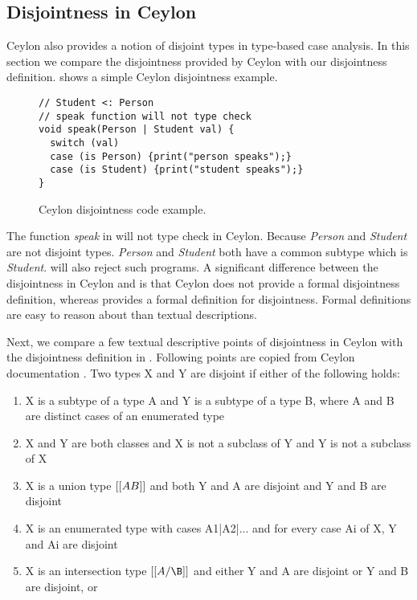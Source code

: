 \subsection{Disjointness in Ceylon}
\label{sec:inter:ceylon}


Ceylon also provides a notion of disjoint types in type-based case analysis. In this section
we compare the disjointness provided by Ceylon with our disjointness definition.
 shows a simple Ceylon disjointness example.


\begin{figure}[t]
\begin{lstlisting}[xleftmargin=.2\textwidth, xrightmargin=.2\textwidth]
// Student <: Person
// speak function will not type check
void speak(Person | Student val) {
  switch (val)
  case (is Person) {print("person speaks");}
  case (is Student) {print("student speaks");} 
}
\end{lstlisting}
\caption{Ceylon disjointness code example.}
\label{inter:list:ceylon}
\end{figure}

\noindent The function \emph{speak} in  
will not type check in Ceylon. Because \emph{Person} and
\emph{Student} are not disjoint types. \emph{Person} and \emph{Student} both have a common
subtype which is \emph{Student}. \cal will also reject such programs.
A significant difference between the disjointness in Ceylon and \cal is that
Ceylon does not provide
a formal disjointness definition, whereas \cal provides a formal definition for
disjointness. Formal definitions are easy to reason about than textual descriptions. 

Next, we compare a few textual descriptive points of disjointness in Ceylon with
the disjointness definition in \cal. Following points are copied from Ceylon
documentation \cite{}. Two types X and Y are disjoint if either of the following holds:

\begin{enumerate}
  \item{X is a subtype of a type A and Y is a subtype of a type B, where A and B are distinct cases of an enumerated type}
  \item{X and Y are both classes and X is not a subclass of Y and Y is not a subclass of X}
  \item{X is a union type $[[A \/ B]]$ and both Y and A are disjoint and Y and B are disjoint}
  \item{X is an enumerated type with cases A1|A2|... and for every case Ai of X, Y and Ai are disjoint}
  \item{X is an intersection type $[[A/\B]]$ and either Y and A are disjoint or Y and B are disjoint, or}
\end{enumerate}

